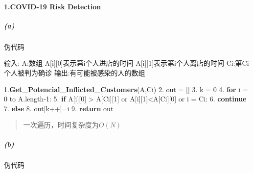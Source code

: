 \documentclass[
]{article}
\author{}
\date{}
\newenvironment{Shaded}{}{}
\newcommand{\ControlFlowTok}[1]{\textcolor[rgb]{0.00,0.44,0.13}{\textbf{#1}}}
\newcommand{\DecValTok}[1]{\textcolor[rgb]{0.25,0.63,0.44}{#1}}
\newcommand{\ErrorTok}[1]{\textcolor[rgb]{1.00,0.00,0.00}{\textbf{#1}}}
\newcommand{\FloatTok}[1]{\textcolor[rgb]{0.25,0.63,0.44}{#1}}
\newcommand{\NormalTok}[1]{#1}
\begin{document}
\hypertarget{header-n0}{%
\paragraph{1.COVID-19 Risk Detection}\label{header-n0}}

\hypertarget{header-n2}{%
\subparagraph{(a)}\label{header-n2}}

伪代码

\begin{Shaded}
\begin{Highlighting}[]
\NormalTok{输入:}
\NormalTok{A:数组}
\NormalTok{  A[i][}\DecValTok{0}\NormalTok{]表示第i个人进店的时间}
\NormalTok{  A[i][}\DecValTok{1}\NormalTok{]表示第i个人离店的时间}
\NormalTok{Ci:第Ci个人被判为确诊}
\NormalTok{输出:有可能被感染的人的数组}
  
\FloatTok{1.}\ErrorTok{Get\_Potencial\_Inflicted\_Customers}\NormalTok{(A,Ci)}
\FloatTok{2.}\NormalTok{	out = []}
\FloatTok{3.}\NormalTok{  k = }\DecValTok{0} 
\FloatTok{4.}  \ControlFlowTok{for}\NormalTok{ i = }\DecValTok{0}\NormalTok{ to A.length{-}}\DecValTok{1}\NormalTok{:}
\FloatTok{5.}    \ControlFlowTok{if}\NormalTok{ A[i][}\DecValTok{0}\NormalTok{] \textgreater{} A[Ci][}\DecValTok{1}\NormalTok{] or A[i][}\DecValTok{1}\NormalTok{]\textless{}A[Ci][}\DecValTok{0}\NormalTok{] or i = Ci:}
\FloatTok{6.}        \ControlFlowTok{continue}
\FloatTok{7.}		\ControlFlowTok{else}
\FloatTok{8.}\NormalTok{				out[k++]=i}
\FloatTok{9.}  \ControlFlowTok{return}\NormalTok{ out}
\end{Highlighting}
\end{Shaded}

\begin{quote}
一次遍历，时间复杂度为\(O(N)\)
\end{quote}

\hypertarget{header-n7}{%
\subparagraph{(b)}\label{header-n7}}

伪代码
\end{document}
